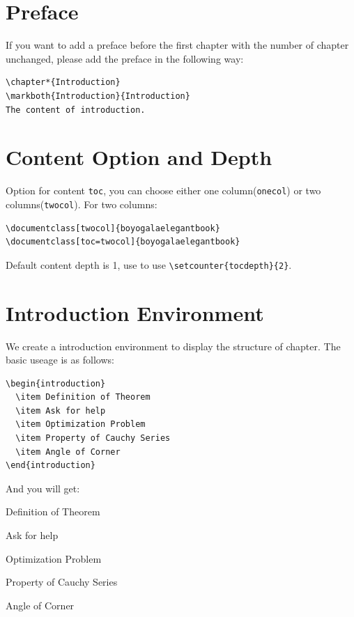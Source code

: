 \documentclass[11pt]{boyogalaelegantbook}
\begin{document}
\section{Preface}

If you want to add a preface before the first chapter with the number of chapter unchanged, please add the preface in the following way:
\begin{lstlisting}
\chapter*{Introduction}
\markboth{Introduction}{Introduction}
The content of introduction.
\end{lstlisting}

\section{Content Option and Depth}
Option for content \lstinline{toc}, you can  choose either one column(\lstinline{onecol}) or two columns(\lstinline{twocol}). For two columns:
\begin{lstlisting}
\documentclass[twocol]{boyogalaelegantbook}
\documentclass[toc=twocol]{boyogalaelegantbook}
\end{lstlisting}

Default content depth is 1, use to use \lstinline|\setcounter{tocdepth}{2}|.

\section{Introduction Environment}
We create a introduction environment to display the structure of chapter. The basic useage is as follows:
\begin{lstlisting}
\begin{introduction}
  \item Definition of Theorem
  \item Ask for help
  \item Optimization Problem
  \item Property of Cauchy Series
  \item Angle of Corner
\end{introduction}
\end{lstlisting}
And you will get:
\begin{introduction}
  \item Definition of Theorem
  \item Ask for help
  \item Optimization Problem
  \item Property of Cauchy Series
  \item Angle of Corner
\end{introduction}
\end{document}
